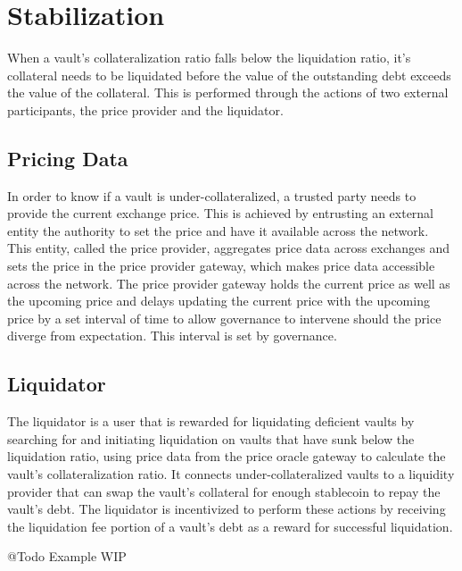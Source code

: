 \documentclass[12pt]{article}
\begin{document}
\section{Stabilization}
When a vault's collateralization ratio falls below the liquidation ratio, it's collateral needs to be liquidated before the value of the outstanding debt exceeds the value of the collateral. This is performed through the actions of two external participants, the price provider and the liquidator.

\subsection{Pricing Data}
In order to know if a vault is under-collateralized, a trusted party needs to provide the current exchange price. This is achieved by entrusting an external entity the authority to set the price and have it available across the network. This entity, called the price provider, aggregates price data across exchanges and sets the price in the price provider gateway, which makes price data accessible across the network. The price provider gateway holds the current price as well as the upcoming price and delays updating the current price with the upcoming price by a set interval of time to allow governance to intervene should the price diverge from expectation. This interval is set by governance.

\subsection{Liquidator}

The liquidator is a user that is rewarded for liquidating deficient vaults by searching for and initiating liquidation on vaults that have sunk below the liquidation ratio, using price data from the price oracle gateway to calculate the vault's collateralization ratio. It connects under-collateralized vaults to a liquidity provider that can swap the vault's collateral for enough stablecoin to repay the vault's debt. The liquidator is incentivized to perform these actions by receiving the liquidation fee portion of a vault's debt as a reward for successful liquidation.

\begin{flushleft}
	\color{red} @Todo Example WIP
\end{flushleft}
\end{document}
